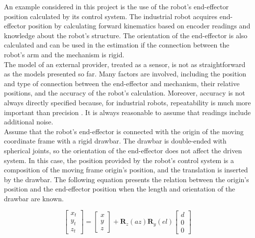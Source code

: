 An example considered in this project is the use of the robot's end-effector position calculated by its control system. The industrial robot acquires end-effector position by calculating forward kinematics based on encoder readings and knowledge about the robot's structure. The orientation of the end-effector is also calculated and can be used in the estimation if the connection between the robot's arm and the mechanism is rigid.\\

The model of an external provider, treated as a sensor, is not as straightforward as the models presented so far. Many factors are involved, including the position and type of connection between the end-effector and mechanism, their relative positions, and the accuracy of the robot’s calculation. Moreover, accuracy is not always directly specified because, for industrial robots, repeatability is much more important than precision \cite{shiakolas2002accuracy}. It is always reasonable to assume that readings include additional noise.\\

Assume that the robot's end-effector is connected with the origin of the moving coordinate frame with a rigid drawbar. The drawbar is double-ended with spherical joints, so the orientation of the end-effector does not affect the driven system. In this case, the position provided by the robot's control system is a composition of the moving frame origin's position, and the translation is inserted by the drawbar. The following equation presents the relation between the origin's position and the end-effector position when the length and orientation of the drawbar are known.

\begin{equation}
	\begin{bmatrix}
		x_t \\ y_t \\ z_t 
	\end{bmatrix}
	=
	\begin{bmatrix}
		x \\ y \\ z 
	\end{bmatrix}
	+
	\bm{R}_z \left( az \right)
	\bm{R}_y \left( el \right)
	\begin{bmatrix}
		d \\ 0 \\ 0 
	\end{bmatrix}
	\label{drawbar_model}
\end{equation}

